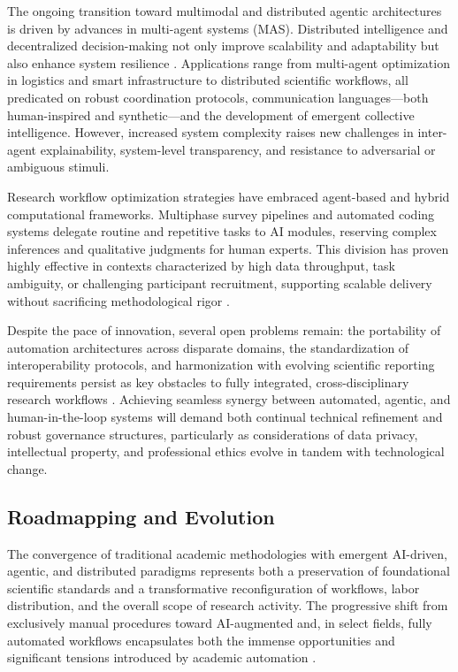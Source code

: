 The ongoing transition toward multimodal and distributed agentic architectures is driven by advances in multi-agent systems (MAS). Distributed intelligence and decentralized decision-making not only improve scalability and adaptability but also enhance system resilience \cite{ref21,ref22,ref25,ref26,ref40,ref49,ref101,ref102,ref111,ref112,ref113,ref114,ref115}. Applications range from multi-agent optimization in logistics and smart infrastructure to distributed scientific workflows, all predicated on robust coordination protocols, communication languages—both human-inspired and synthetic—and the development of emergent collective intelligence. However, increased system complexity raises new challenges in inter-agent explainability, system-level transparency, and resistance to adversarial or ambiguous stimuli.

Research workflow optimization strategies have embraced agent-based and hybrid computational frameworks. Multiphase survey pipelines and automated coding systems delegate routine and repetitive tasks to AI modules, reserving complex inferences and qualitative judgments for human experts. This division has proven highly effective in contexts characterized by high data throughput, task ambiguity, or challenging participant recruitment, supporting scalable delivery without sacrificing methodological rigor \cite{ref51,ref70,ref76,ref80,ref83,ref94,ref96}.

Despite the pace of innovation, several open problems remain: the portability of automation architectures across disparate domains, the standardization of interoperability protocols, and harmonization with evolving scientific reporting requirements persist as key obstacles to fully integrated, cross-disciplinary research workflows \cite{ref28,ref29,ref31,ref78,ref80}. Achieving seamless synergy between automated, agentic, and human-in-the-loop systems will demand both continual technical refinement and robust governance structures, particularly as considerations of data privacy, intellectual property, and professional ethics evolve in tandem with technological change.

\subsection{Roadmapping and Evolution}

The convergence of traditional academic methodologies with emergent AI-driven, agentic, and distributed paradigms represents both a preservation of foundational scientific standards and a transformative reconfiguration of workflows, labor distribution, and the overall scope of research activity. The progressive shift from exclusively manual procedures toward AI-augmented and, in select fields, fully automated workflows encapsulates both the immense opportunities and significant tensions introduced by academic automation \cite{ref25,ref26,ref40,ref52,ref56,ref61,ref64,ref69,ref80}.

